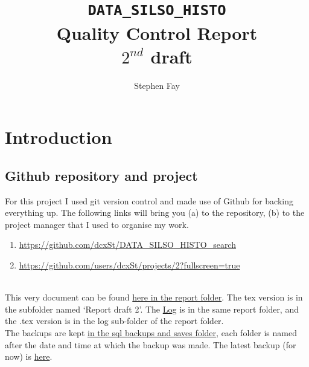 \documentclass[12pt]{article}
\renewcommand\qedsymbol{$\Smiley$}
\begin{document}
 
 
\title{\texttt{DATA\_SILSO\_HISTO}\\Quality Control Report\\$2^{nd}$ draft}
\author{Stephen Fay}
\maketitle

\tableofcontents

\section{Introduction}
\subsection{Github repository and project}
For this project I used git version control and made use of Github for backing everything up. The following links will bring you (a) to the repository, (b) to the project manager that I used to organise my work.
\begin{enumerate}[(\alph*)]
    \item \href{https://github.com/dcxSt/DATA\_SILSO\_HISTO\_search}{https://github.com/dcxSt/DATA\_SILSO\_HISTO\_search}
    \item \href{https://github.com/users/dcxSt/projects/2?fullscreen=true}{https://github.com/users/dcxSt/projects/2?fullscreen=true}
\end{enumerate}\\

This very document can be found  \href{https://github.com/dcxSt/DATA_SILSO_HISTO_search/blob/master/report/DATA_SILSO_HISTO_quality_control_Report_draft2.pdf}{here in the report folder}. The tex version is in the subfolder named `Report draft 2'. The \href{https://github.com/dcxSt/DATA_SILSO_HISTO_search/blob/master/report/Stephen_ORB_Log.pdf}{Log} is in the same report folder, and the .tex version is in the log sub-folder of the report folder.\\

The backups are kept \href{https://github.com/dcxSt/DATA_SILSO_HISTO_search/tree/master/sql_backups_and_saves}{in the sql backups and saves folder}, each folder is named after the date and time at which the backup was made. The latest backup (for now) is \href{https://github.com/dcxSt/DATA_SILSO_HISTO_search/tree/master/sql_backups_and_saves/2019-08-29_15:28:48.045748}{here}.
\end{document}
